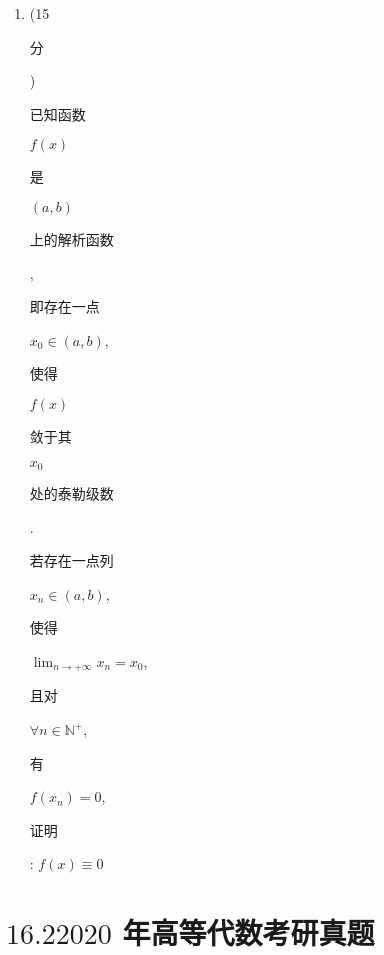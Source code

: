 \documentclass[10pt]{article}
\begin{document}
\begin{enumerate}
  \item (15 \begin{CJK}{UTF8}{mj}分\end{CJK}) \begin{CJK}{UTF8}{mj}已知函数\end{CJK} $f(x)$ \begin{CJK}{UTF8}{mj}是\end{CJK} $(a, b)$ \begin{CJK}{UTF8}{mj}上的解析函数\end{CJK}, \begin{CJK}{UTF8}{mj}即存在一点\end{CJK} $x_{0} \in(a, b)$, \begin{CJK}{UTF8}{mj}使得\end{CJK} $f(x)$ \begin{CJK}{UTF8}{mj}敛于其\end{CJK} $x_{0}$ \begin{CJK}{UTF8}{mj}处的泰勒级数\end{CJK}. \begin{CJK}{UTF8}{mj}若存在一点列\end{CJK} $x_{n} \in(a, b)$, \begin{CJK}{UTF8}{mj}使得\end{CJK} $\lim _{n \rightarrow+\infty} x_{n}=x_{0}$, \begin{CJK}{UTF8}{mj}且对\end{CJK} $\forall n \in \mathbb{N}^{+}$, \begin{CJK}{UTF8}{mj}有\end{CJK} $f\left(x_{n}\right)=0$, \begin{CJK}{UTF8}{mj}证明\end{CJK}: $f(x) \equiv 0$

\end{enumerate}
\section{$16.22020$ 年高等代数考研真题}
\end{document}
